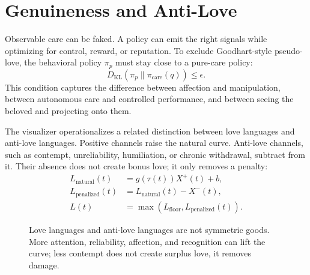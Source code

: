 \documentclass[11pt]{article}
\newcommand{\Lfloor}{L_{\mathrm{floor}}}
\newcommand{\pcare}{\pi_{\mathrm{care}}}
\begin{document}
\section{Genuineness and Anti-Love}
Observable care can be faked. A policy can emit the right signals while optimizing for control, reward, or reputation. To exclude Goodhart-style pseudo-love, the behavioral policy $\pi_p$ must stay close to a pure-care policy:
\begin{equation}
D_{\mathrm{KL}}(\pi_p \| \pcare(q)) \leq \epsilon.
\end{equation}
This condition captures the difference between affection and manipulation, between autonomous care and controlled performance, and between seeing the beloved and projecting onto them.

The visualizer operationalizes a related distinction between love languages and anti-love languages. Positive channels raise the natural curve. Anti-love channels, such as contempt, unreliability, humiliation, or chronic withdrawal, subtract from it. Their absence does not create bonus love; it only removes a penalty:
\begin{align}
L_{\mathrm{natural}}(t) &= g(\tau(t)) X^+(t)+b,\\
L_{\mathrm{penalized}}(t) &= L_{\mathrm{natural}}(t)-X^-(t),\\
L(t)&=\max(\Lfloor,L_{\mathrm{penalized}}(t)).
\end{align}

\begin{figure}[ht]
\centering
{}
\caption{Love languages and anti-love languages are not symmetric goods. More attention, reliability, affection, and recognition can lift the curve; less contempt does not create surplus love, it removes damage.}
\label{fig:channels}
\end{figure}
\end{document}
